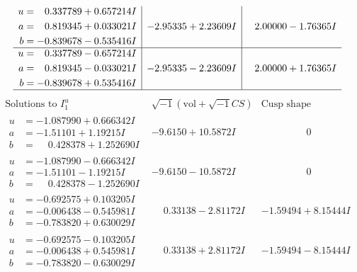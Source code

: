 \documentclass[1p]{elsarticle_modified}
\theoremstyle{definition}
\newcommand{\I}{\sqrt{-1}}
\begin{document}
$$\begin{array}{c|c|c}
\begin{aligned}
u &= \phantom{-}0.337789 + 0.657214 I \\
a &= \phantom{-}0.819345 + 0.033021 I \\
b &= -0.839678 - 0.535416 I\end{aligned}
 & -2.95335 + 2.23609 I & \phantom{-}2.00000 - 1.76365 I \\ \hline\begin{aligned}
u &= \phantom{-}0.337789 - 0.657214 I \\
a &= \phantom{-}0.819345 - 0.033021 I \\
b &= -0.839678 + 0.535416 I\end{aligned}
 & -2.95335 - 2.23609 I & \phantom{-}2.00000 + 1.76365 I\\
 \hline 
 \end{array}$$\newpage$$\begin{array}{c|c|c}  
\text{Solutions to }I^u_{1}& \I (\text{vol} + \sqrt{-1}CS) & \text{Cusp shape}\\
 \hline 
\begin{aligned}
u &= -1.087990 + 0.666342 I \\
a &= -1.51101 + 1.19215 I \\
b &= \phantom{-}0.428378 + 1.252690 I\end{aligned}
 & -9.6150 + 10.5872 I & \phantom{-0.000000 } 0 \\ \hline\begin{aligned}
u &= -1.087990 - 0.666342 I \\
a &= -1.51101 - 1.19215 I \\
b &= \phantom{-}0.428378 - 1.252690 I\end{aligned}
 & -9.6150 - 10.5872 I & \phantom{-0.000000 } 0 \\ \hline\begin{aligned}
u &= -0.692575 + 0.103205 I \\
a &= -0.006438 - 0.545981 I \\
b &= -0.783820 + 0.630029 I\end{aligned}
 & \phantom{-}0.33138 - 2.81172 I & -1.59494 + 8.15444 I \\ \hline\begin{aligned}
u &= -0.692575 - 0.103205 I \\
a &= -0.006438 + 0.545981 I \\
b &= -0.783820 - 0.630029 I\end{aligned}
 & \phantom{-}0.33138 + 2.81172 I & -1.59494 - 8.15444 I \\ \hline\begin{aligned}

\end{aligned}
\end{array}$$
\end{document}
